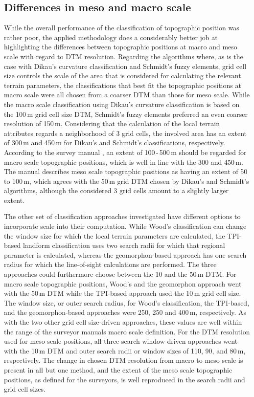 \documentclass[preprint,12pt,authoryear]{elsarticle}
\begin{document}
\subsection{Differences in meso and macro scale}
While the overall performance of the classification of topographic position was rather poor, the applied methodology does a considerably better job at highlighting the differences between topographic positions at macro and meso scale with regard to DTM resolution.
Regarding the algorithms where, as is the case with Dikau's curvature classification and Schmidt's fuzzy elements, grid cell size controls the scale of the area that is considered for calculating the relevant terrain parameters, the classifications that best fit the topographic positions at macro scale were all chosen from a coarser DTM than those for meso scale. While the macro scale classification using Dikau's curvature classification is based on the 100\,m grid cell size DTM, Schmidt's fuzzy elements preferred an even coarser resolution of 150\,m. Considering that the calculation of the local terrain attributes regards a neighborhood of 3 grid cells, the involved area has an extent of 300\,m and 450\,m for Dikau's and Schmidt's classifications, respectively. According to the survey manual \citep{Englisch1998}, an extent of 100\,-\,500\,m should be regarded for macro scale topographic positions, which is well in line with the 300 and 450\,m. The manual describes meso scale topographic positions as having an extent of 50 to 100\,m, which agrees with the 50\,m grid DTM chosen by Dikau's and Schmidt's algorithms, although the considered 3 grid cells amount to a slightly larger extent.

The other set of classification approaches investigated have different options to incorporate scale into their computation. While Wood's classification can change the window size for which the local terrain parameters are calculated, the TPI-based landform classification uses two search radii for which that regional parameter is calculated, whereas the geomorphon-based approach has one search radius for which the line-of-sight calculations are performed. The three approaches could furthermore choose between the 10 and the 50\,m DTM. For macro scale topographic positions, Wood's and the geomorphon approach went with the 50\,m DTM while the TPI-based approach used the 10\,m grid cell size. The window size, or outer search radius, for Wood's classification, the TPI-based, and the geomorphon-based approaches were 250, 250 and 400\,m, respectively. As with the two other grid cell size-driven approaches, these values are well within the range of the surveyor manuals macro scale definition. For the DTM resolution used for meso scale positions, all three search window-driven approaches went with the 10\,m DTM and outer search radii or window sizes of 110, 90, and 80\,m, respectively. The change in chosen DTM resolution from macro to meso scale is present in all but one method, and the extent of the meso scale topographic positions, as defined for the surveyors, is well reproduced in the search radii and grid cell sizes.
\end{document}
